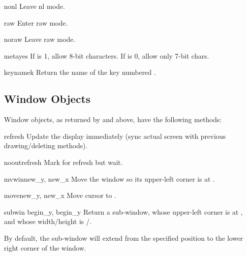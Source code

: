 \begin{funcdesc}{nonl}{}
Leave nl mode.
\end{funcdesc}

\begin{funcdesc}{raw}{}
Enter raw mode.
\end{funcdesc}

\begin{funcdesc}{noraw}{}
Leave raw mode.
\end{funcdesc}

\begin{funcdesc}{meta}{yes}
If  is 1, allow 8-bit characters. If  is 0, 
allow only 7-bit chars.
\end{funcdesc}

\begin{funcdesc}{keyname}{k}
Return the name of the key numbered .
\end{funcdesc}


\subsection{Window Objects \label{curses-window-objects}}

Window objects, as returned by  and
 above, have the
following methods:

\begin{methoddesc}{refresh}{}
Update the display immediately (sync actual screen with previous
drawing/deleting methods).
\end{methoddesc}

\begin{methoddesc}{nooutrefresh}{}
Mark for refresh but wait.
\end{methoddesc}

\begin{methoddesc}{mvwin}{new_y, new_x}
Move the window so its upper-left corner is at .
\end{methoddesc}

\begin{methoddesc}{move}{new_y, new_x}
Move cursor to .
\end{methoddesc}

\begin{methoddesc}{subwin}{ begin_y, begin_y}
Return a sub-window, whose upper-left corner is at
, and whose width/height is
/.

By default, the sub-window will extend from the
specified position to the lower right corner of the window.
\end{methoddesc}

